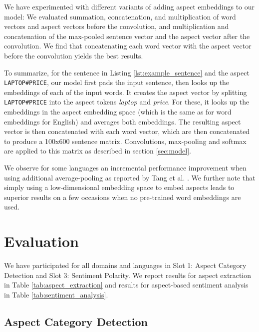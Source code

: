 \documentclass[11pt,letterpaper]{article}
\begin{document}
We have experimented with different variants of adding aspect embeddings to our model: We evaluated summation, concatenation, and multiplication of word vectors and aspect vectors before the convolution, and multiplication and concatenation of the max-pooled sentence vector and the aspect vector after the convolution. We find that concatenating each word vector with the aspect vector before the convolution yields the best results.

To summarize, for the sentence in Listing \ref{lst:example_sentence} and the aspect \texttt{LAPTOP\#PRICE}, our model first pads the input sentence, then looks up the embeddings of each of the input words. It creates the aspect vector by splitting \texttt{LAPTOP\#PRICE} into the aspect tokens \emph{laptop} and \emph{price}. For these, it looks up the embeddings in the aspect embedding space (which is the same as for word embeddings for English) and averages both embeddings. The resulting aspect vector is then concatenated with each word vector, which are then concatenated to produce a 100x600 sentence matrix. Convolutions, max-pooling and softmax are applied to this matrix as described in section \ref{sec:model}.

We observe for some languages an incremental performance improvement when using additional average-pooling as reported by Tang et al. . We further note that simply using a low-dimensional embedding space to embed aspects leads to superior results on a few occasions when no pre-trained word embeddings are used.

\section{Evaluation}

We have participated for all domains and languages in Slot 1: Aspect Category Detection and Slot 3: Sentiment Polarity. We report results for aspect extraction in Table \ref{tab:aspect_extraction} and results for aspect-based sentiment analysis in Table \ref{tab:sentiment_analysis}.

\subsection{Aspect Category Detection} \label{sec:aspect_extraction}
\end{document}
